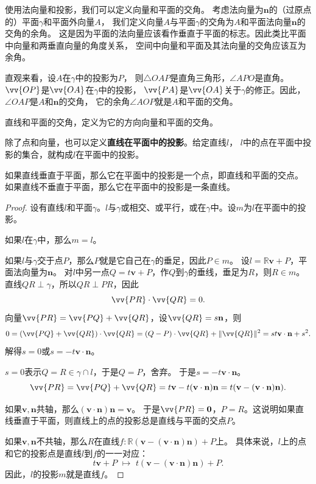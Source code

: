 \documentclass[12pt,UTF8]{ctexbook}
\begin{document}
使用法向量和投影，我们可以定义向量和平面的交角。
考虑法向量为$\mathbf{n}$的（过原点的）平面$\gamma$和平面外向量$A$，
我们定义向量$A$与平面$\gamma$的交角为$A$和平面法向量$\mathbf{n}$的交角的余角。
这是因为平面的法向量应该看作垂直于平面的标志。因此类比平面中向量和两垂直向量的角度关系，
空间中向量和平面及其法向量的交角应该互为余角。

直观来看，设$A$在$\gamma$中的投影为$P$，
则$\triangle OAP$是直角三角形，$\angle APO$是直角。$\vv{OP}$是$\vv{OA}$在$\gamma$中的投影，
$\vv{PA}$是$\vv{OA}$关于$\gamma$的修正。因此，$\angle OAP$是$A$和$\mathbf{n}$的交角，
它的余角$\angle AOP$就是$A$和平面的交角。

直线和平面的交角，定义为它的方向向量和平面的交角。

除了点和向量，也可以定义\textbf{直线在平面中的投影}。给定直线$l$，
$l$中的点在平面中投影的集合，就构成$l$在平面中的投影。
\begin{tm}\label{tm:1-3-55}
    如果直线垂直于平面，那么它在平面中的投影是一个点，即直线和平面的交点。
    如果直线不垂直于平面，那么它在平面中的投影是一条直线。    
\end{tm}
\begin{proof}
    设有直线$l$和平面$\gamma$。$l$与$\gamma$或相交、或平行，或在$\gamma$中。设$m$为$l$在平面中的投影。

    如果$l$在$\gamma$中，那么$m=l$。

    如果$l$与$\gamma$交于点$P$，那么$P$就是它自己在$\gamma$的垂足，因此$P\in m$。
    设$l=\mathbb{R}\mathbf{v}+P$，平面法向量为$\mathbf{n}$。
    对$l$中另一点$Q = t\mathbf{v}+P$，作$Q$到$\gamma$的垂线，垂足为$R$，则$R\in m$。
    直线$QR\perp\gamma$，所以$QR\perp PR$，因此
    $$ \vv{PR}\cdot\vv{QR} = 0.$$
    向量$\vv{PR} = \vv{PQ} + \vv{QR}$，设$\vv{QR} = s\mathbf{n}$，则
    $$ 0 = (\vv{PQ} + \vv{QR})\cdot\vv{QR} = (Q - P) \cdot\vv{QR} + \|\vv{QR}\|^2 = st\mathbf{v}\cdot\mathbf{n} + s^2. $$
    解得$s=0$或$s = -t\mathbf{v}\cdot\mathbf{n}$。
    
    $s=0$表示$Q=R\in \gamma\cap l$，于是$Q=P$，舍弃。
    于是$s = -t\mathbf{v}\cdot\mathbf{n}$。
    $$\vv{PR} = \vv{PQ} + \vv{QR} = t\mathbf{v} -t(\mathbf{v}\cdot\mathbf{n})\mathbf{n} = t(\mathbf{v} - (\mathbf{v}\cdot\mathbf{n})\mathbf{n}). $$
    
    如果$\mathbf{v}, \mathbf{n}$共轴，那么$(\mathbf{v}\cdot\mathbf{n})\mathbf{n} = \mathbf{v}$。
    于是$\vv{PR} = \mathbf{0}$，$P = R$。这说明如果直线垂直于平面，则直线上的点的投影总是直线与平面的交点$P$。

    如果$\mathbf{v},\mathbf{n}$不共轴，那么$R$在直线$f:\mathbb{R}(\mathbf{v} - (\mathbf{v}\cdot\mathbf{n})\mathbf{n}) + P$上。
    具体来说，$l$上的点和它的投影点是直线$l$到$f$的一一对应：
    $$ t\mathbf{v}+P \,\,\mapsto \,\, t(\mathbf{v} - (\mathbf{v}\cdot\mathbf{n})\mathbf{n}) + P.$$
    因此，$l$的投影$m$就是直线$f$。
    
\end{proof}
\end{document}
